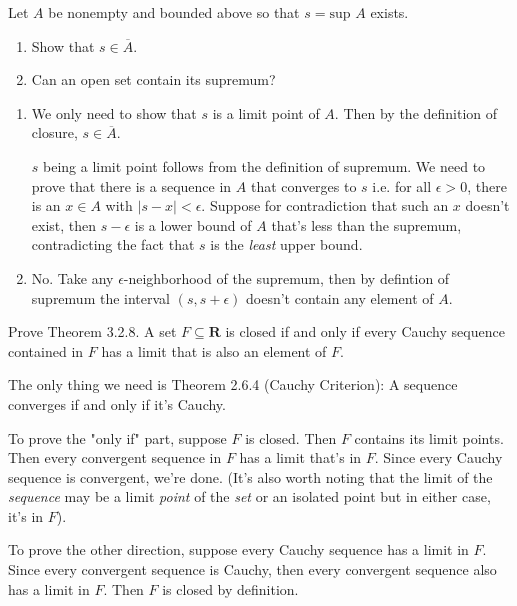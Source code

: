 \documentclass{oxmathproblems}
\begin{document}
\begin{questions}
\miquestion Let $A$ be nonempty and bounded above so that $s = \text{sup } A$ exists.
\begin{enumerate}[label=(\alph*)]
  \item Show that $s \in \overline{A}$.
  \item Can an open set contain its supremum?
\end{enumerate}

\begin{solution}
  \begin{enumerate}[label=(\alph*)]
    \item We only need to show that $s$ is a limit point of $A$. Then by the definition of closure, $s \in \overline{A}$.
    
    $s$ being a limit point follows from the definition of supremum. We need to prove that there is a sequence in $A$ that converges to $s$ i.e. for all $\epsilon > 0$,
    there is an $x \in A$ with $|s-x| < \epsilon$. Suppose for contradiction that such an $x$ doesn't exist, then $s-\epsilon$ is a lower bound of $A$ that's less
    than the supremum, contradicting the fact that $s$ is the \textit{least} upper bound.

    \item No. Take any $\epsilon$-neighborhood of the supremum, then by defintion of supremum the interval $(s, s+\epsilon)$ doesn't contain any element of $A$.
  \end{enumerate}
\end{solution}

\miquestion Prove Theorem 3.2.8. A set $F \subseteq \textbf{R}$ is closed if and only if every Cauchy sequence contained in $F$ has a limit that is also an element of $F$.
\begin{solution}
  The only thing we need is Theorem 2.6.4 (Cauchy Criterion): A sequence converges if and only if it's Cauchy.

  To prove the "only if" part, suppose $F$ is closed. Then $F$ contains its limit points. Then every convergent sequence in $F$ has a limit that's in $F$. Since every Cauchy sequence
  is convergent, we're done. (It's also worth noting that the limit of the \textit{sequence} may be a limit \textit{point} of the \textit{set} or an isolated point but in either case, it's in $F$).

  To prove the other direction, suppose every Cauchy sequence has a limit in $F$. Since every convergent sequence is Cauchy, then every convergent sequence also has a limit in $F$. Then
  $F$ is closed by definition.
\end{solution}


\end{questions}
\end{document}

